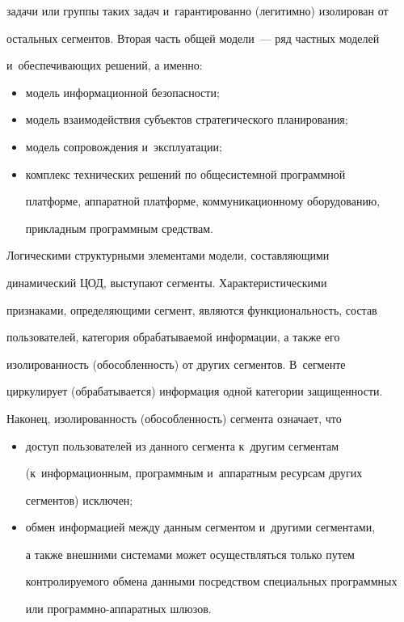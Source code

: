 задачи или группы таких задач и~гарантированно (легитимно) изолирован от 


остальных сегментов. Вторая часть общей модели~--- ряд частных моделей 


и~обеспечивающих решений, а именно:


\begin{itemize}


\item модель информационной безопасности;


\item модель взаимодействия субъектов стратегического планирования;


\item модель сопровождения и~эксплуатации;


\item комплекс технических решений по общесистемной программной 


платформе, аппаратной платформе, коммуникационному оборудованию, 


прикладным программным средствам.


\end{itemize}





Логическими структурными элементами модели, составляющими 


динамический ЦОД, выступают сегменты. Характеристическими 


признаками, определяющими сегмент, являются функциональность, состав 


пользователей, категория обрабатываемой информации, а также его 


изолированность (обособленность) от других сегментов. В~сегменте 


циркулирует (обрабатывается) информация одной категории защищенности. 


Наконец, изолированность (обособленность) сегмента означает, что\\[-14pt]


\begin{itemize}


\item доступ пользователей из данного сегмента к~другим сегментам 


(к~информационным, программным и~аппаратным ресурсам других 


сегментов) исключен;\\[-14pt]


\item обмен информацией между данным сегментом и~другими сегментами, 


а также внешними системами может осуществляться только путем 


контролируемого обмена данными посредством специальных программных 


или программно-ап\-па\-рат\-ных шлюзов.\\[-14pt]


\end{itemize}





